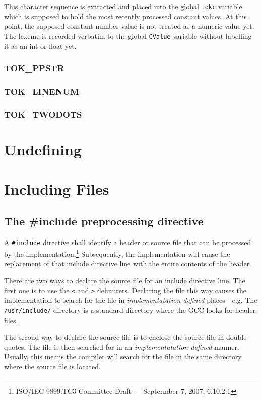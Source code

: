 This character sequence is extracted and placed into the global \verb|tokc| variable which is supposed to hold the most recently processed constant values. At this point, the supposed constant number value is not treated as a numeric value yet. The lexeme is recorded verbatim to the global \verb|CValue| variable without labelling it as an int or float yet.


\subsubsection{TOK\_PPSTR}
\subsubsection{TOK\_LINENUM}
\subsubsection{TOK\_TWODOTS}






\section{Undefining}

\section{Including Files}

\subsection{The \#include preprocessing directive}

A \verb|#include| directive shall identify a header or source file that can be processed by the implementation.\footnote{ISO/IEC 9899:TC3 Committee Draft — Septermber 7, 2007, 6.10.2.1} Subsequently, the implementation will cause the replacement of that include directive line with the entire contents of the header.

There are two ways to declare the source file for an include directive line. The first one is to use the \verb|<| and \verb|>| delimiters. Declaring the file this way causes the implementation to search for the file in \emph{implementatation-defined} places - e.g. The \verb|/usr/include/| directory is a standard directory where the GCC looks for header files.

The second way to declare the source file is to enclose the source file in double quotes. The file is then searched for in an \emph{implementatation-defined} manner. Usually, this means the compiler will search for the file in the same directory where the source file is located.

